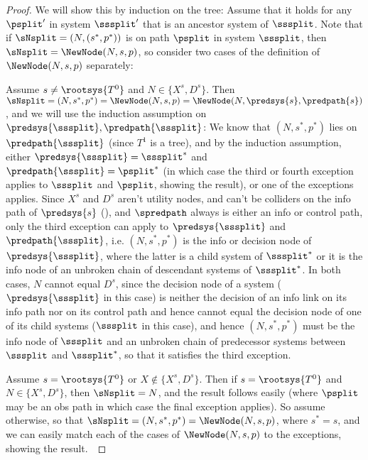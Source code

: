 \begin{proof}
    We will show this by induction on the tree: Assume that it holds for any $\psplit'$ in system $\sssplit'$ that is an ancestor system of $\sssplit$. Note that if $\sNsplit=(N,(s^*,p^*))$ is on path $\psplit$ in system $\sssplit$, then $\sNsplit=\NewNode(N,s,p)$, so consider two cases of the definition of $\NewNode(N,s,p)$ separately:
    
     {Assume $s\neq \rootsys{T^0}$ and $N\in \{ X^s, D^s \}$.} Then $\sNsplit = (N, s^*, p^*) = \NewNode(N, s, p) = \NewNode(N, \predsys{s}, \predpath{s})$, and we will use the induction assumption on $\predsys{\sssplit}, \predpath{\sssplit}$: We know that $(N, s^*, p^*)$ lies on $\predpath{\sssplit}$ (since $T^1$ is a tree), and by the induction assumption, either $\predsys{\sssplit}=\sssplit^*$ and $\predpath{\sssplit}= \psplit^*$ (in which case the third or fourth exception applies to $\sssplit$ and $\psplit$, showing the result), or one of the exceptions applies. Since $X^s$ and $D^s$ aren't utility nodes, and can't be colliders on the info path of $\predsys{s}$ (), and $\spredpath$ always is either an info or control path, only the third exception can apply to $\predsys{\sssplit}$ and $\predpath{\sssplit}$, i.e. $(N, s^*, p^*)$ is the info or decision node of $\predsys{\sssplit}$, where the latter is a child system of $\sssplit^*$ or it is the info node of an unbroken chain of descendant systems of $\sssplit^*$. In both cases, $N$ cannot equal $D^s$, since the decision node of a system ($\predsys{\sssplit}$ in this case) is neither the decision of an info link on its info path nor on its control path and hence cannot equal the decision node of one of its child systems ($\sssplit$ in this case), and hence $(N, s^*, p^*)$ must be the info node of $\sssplit$ and an unbroken chain of predecessor systems between $\sssplit$ and $\sssplit^*$, so that it satisfies the third exception.
    
    
     {Assume $s= \rootsys{T^0}$ or $X \notin \{X^s, D^s\}$.} Then if $s=\rootsys{T^0}$ and $N\in \{X^s, D^s\}$, then $\sNsplit = N$, and the result follows easily (where $\psplit$ may be an obs path in which case the final exception applies). So assume otherwise, so that  $\sNsplit = (N, s^*, p^*)= \NewNode(N, s, p)$, where $s^*=s$, and we can easily match each of the cases of $\NewNode(N, s, p)$ to the exceptions, showing the result.~
\end{proof}







